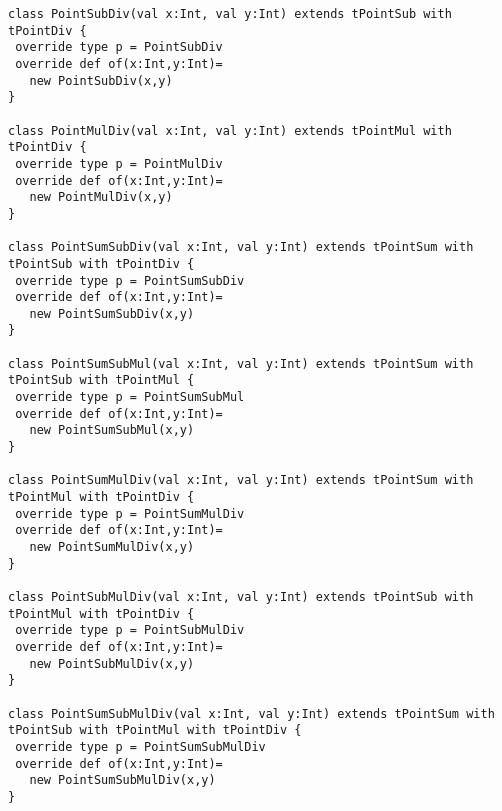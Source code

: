 \begin{lstlisting}
class PointSubDiv(val x:Int, val y:Int) extends tPointSub with tPointDiv {
 override type p = PointSubDiv
 override def of(x:Int,y:Int)=
   new PointSubDiv(x,y)
}

class PointMulDiv(val x:Int, val y:Int) extends tPointMul with tPointDiv {
 override type p = PointMulDiv
 override def of(x:Int,y:Int)=
   new PointMulDiv(x,y)
}

class PointSumSubDiv(val x:Int, val y:Int) extends tPointSum with tPointSub with tPointDiv {
 override type p = PointSumSubDiv
 override def of(x:Int,y:Int)=
   new PointSumSubDiv(x,y)
}

class PointSumSubMul(val x:Int, val y:Int) extends tPointSum with tPointSub with tPointMul {
 override type p = PointSumSubMul
 override def of(x:Int,y:Int)=
   new PointSumSubMul(x,y)
}

class PointSumMulDiv(val x:Int, val y:Int) extends tPointSum with tPointMul with tPointDiv {
 override type p = PointSumMulDiv
 override def of(x:Int,y:Int)=
   new PointSumMulDiv(x,y)
}

class PointSubMulDiv(val x:Int, val y:Int) extends tPointSub with tPointMul with tPointDiv {
 override type p = PointSubMulDiv
 override def of(x:Int,y:Int)=
   new PointSubMulDiv(x,y)
}

class PointSumSubMulDiv(val x:Int, val y:Int) extends tPointSum with tPointSub with tPointMul with tPointDiv {
 override type p = PointSumSubMulDiv
 override def of(x:Int,y:Int)=
   new PointSumSubMulDiv(x,y)
}
\end{lstlisting}
